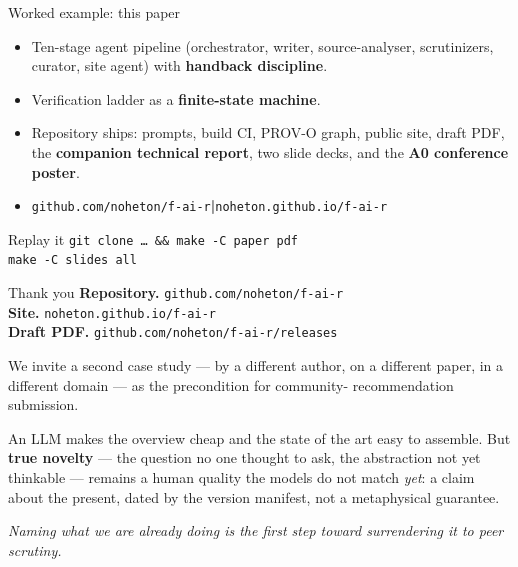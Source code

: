 \documentclass[aspectratio=169,11pt]{beamer}
\begin{document}
\begin{frame}{Worked example: this paper}
  \begin{itemize}
    \item Ten-stage agent pipeline (orchestrator, writer, source-analyser, scrutinizers, curator, site agent) with \textbf{handback discipline}.
    \item Verification ladder as a \textbf{finite-state machine}.
    \item Repository ships: prompts, build CI, PROV-O graph, public site,
          draft PDF, the \textbf{companion technical report}, two slide decks,
          and the \textbf{A0 conference poster}.
    \item \texttt{github.com/noheton/f-ai-r}\quad\textbf{|}\quad\texttt{noheton.github.io/f-ai-r}
  \end{itemize}

  \vspace{0.6em}
  \begin{block}{Replay it}
    \texttt{git clone \dots\ \&\&\ make -C paper pdf}\\
    \texttt{make -C slides all}
  \end{block}
\end{frame}


\begin{frame}{Thank you}
  \textbf{Repository.} \texttt{github.com/noheton/f-ai-r}\\
  \textbf{Site.} \texttt{noheton.github.io/f-ai-r}\\
  \textbf{Draft PDF.} \texttt{github.com/noheton/f-ai-r/releases}

  \vspace{0.8em}
  We invite a second case study --- by a different author, on a different
  paper, in a different domain --- as the precondition for community-
  recommendation submission.

  \vspace{0.6em}
  An LLM makes the overview cheap and the state of the art easy to assemble.
  But \textbf{true novelty} --- the question no one thought to ask, the
  abstraction not yet thinkable --- remains a human quality the models do not
  match \emph{yet}: a claim about the present, dated by the version manifest,
  not a metaphysical guarantee.

  \vspace{0.6em}
  \emph{Naming what we are already doing is the first step toward surrendering
  it to peer scrutiny.}
\end{frame}
\end{document}
